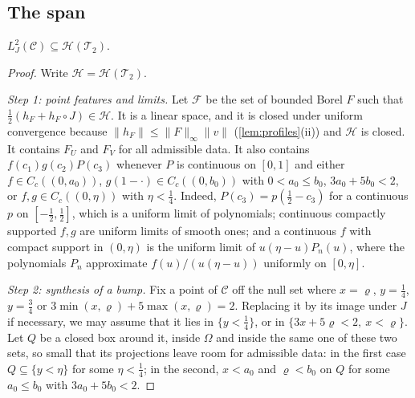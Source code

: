 \documentclass[11pt,colorlinks]{charlie}
\newcommand{\Om}{\Omega}
\begin{document}
\subsection{The span}
\begin{lemma}\label{lem:density}
$L^2_J(\mathcal C)\subseteq\mathcal H(\mathcal T_2)$.
\end{lemma}
\begin{proof}
Write $\mathcal H=\mathcal H(\mathcal T_2)$.

\emph{Step 1: point features and limits.} Let $\mathcal F$ be the set of bounded Borel $F$ such that $\frac12(h_F+h_F\circ J)\in\mathcal H$. It is a linear space, and it is closed under uniform convergence because $\|h_F\|\le\|F\|_\infty\|v\|$ (\cref{lem:profiles}(ii)) and $\mathcal H$ is closed. It contains $F_U$ and $F_V$ for all admissible data. It also contains $f(c_1)g(c_2)P(c_3)$ whenever $P$ is continuous on $[0,1]$ and either $f\in C_c((0,a_0))$, $g(1-\cdot)\in C_c((0,b_0))$ with $0<a_0\le b_0$, $3a_0+5b_0<2$, or $f,g\in C_c((0,\eta))$ with $\eta<\frac14$. Indeed, $P(c_3)=p(\frac12-c_3)$ for a continuous $p$ on $[-\frac12,\frac12]$, which is a uniform limit of polynomials; continuous compactly supported $f,g$ are uniform limits of smooth ones; and a continuous $f$ with compact support in $(0,\eta)$ is the uniform limit of $u(\eta-u)P_n(u)$, where the polynomials $P_n$ approximate $f(u)/(u(\eta-u))$ uniformly on $[0,\eta]$.

\emph{Step 2: synthesis of a bump.} Fix a point of $\mathcal C$ off the null set where $x=\varrho$, $y=\frac14$, $y=\frac34$ or $3\min(x,\varrho)+5\max(x,\varrho)=2$. Replacing it by its image under $J$ if necessary, we may assume that it lies in $\{y<\frac14\}$, or in $\{3x+5\varrho<2,\ x<\varrho\}$. Let $Q$ be a closed box around it, inside $\Om$ and inside the same one of these two sets, so small that its projections leave room for admissible data: in the first case $Q\subseteq\{y<\eta\}$ for some $\eta<\frac14$; in the second, $x<a_0$ and $\varrho<b_0$ on $Q$ for some $a_0\le b_0$ with $3a_0+5b_0<2$.


\end{proof}
\end{document}
